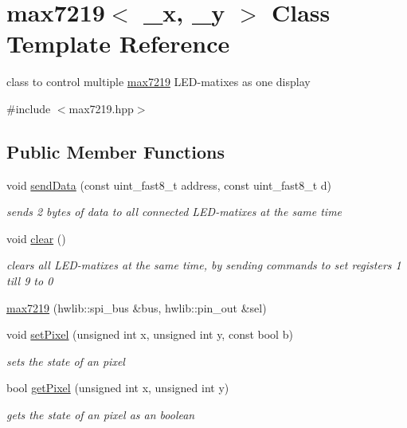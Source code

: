\hypertarget{classmax7219}{}\section{max7219$<$ \+\_\+x, \+\_\+y $>$ Class Template Reference}
\label{classmax7219}


class to control multiple \mbox{\hyperlink{classmax7219}{max7219}} L\+E\+D-\/matixes as one display  




{\ttfamily \#include $<$max7219.\+hpp$>$}

\subsection*{Public Member Functions}
\begin{DoxyCompactItemize}
\item 
void \mbox{\hyperlink{classmax7219_a1a4ed4fb055b10180d4d35d9b3ccd764}{send\+Data}} (const uint\+\_\+fast8\+\_\+t address, const uint\+\_\+fast8\+\_\+t d)
\begin{DoxyCompactList}\small\item\em sends 2 bytes of data to all connected L\+E\+D-\/matixes at the same time \end{DoxyCompactList}\item 
void \mbox{\hyperlink{classmax7219_a51d0384d961359235b9a159f4d1a3752}{clear}} ()
\begin{DoxyCompactList}\small\item\em clears all L\+E\+D-\/matixes at the same time, by sending commands to set registers 1 till 9 to 0 \end{DoxyCompactList}\item 
\mbox{\hyperlink{classmax7219_aa0ed4b1bcde10c1d92c90337f9a54540}{max7219}} (hwlib\+::spi\+\_\+bus \&bus, hwlib\+::pin\+\_\+out \&sel)
\item 
void \mbox{\hyperlink{classmax7219_a85605fc742c9179bb4711c9826c2ecb5}{set\+Pixel}} (unsigned int x, unsigned int y, const bool b)
\begin{DoxyCompactList}\small\item\em sets the state of an pixel \end{DoxyCompactList}\item 
bool \mbox{\hyperlink{classmax7219_a9bc3ca9df2c623b75596c90c32328c73}{get\+Pixel}} (unsigned int x, unsigned int y)
\begin{DoxyCompactList}\small\item\em gets the state of an pixel as an boolean \end{DoxyCompactList}\item 

\end{DoxyCompactItemize}
